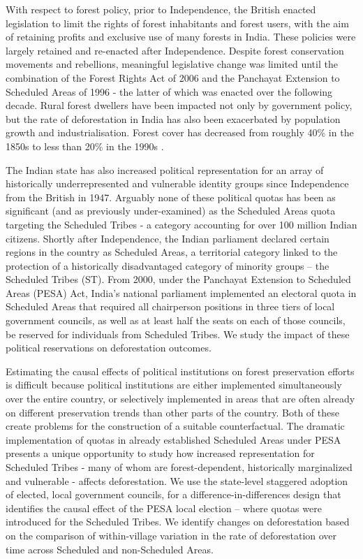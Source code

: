 \documentclass[12pt,reqno]{article}
\begin{document}
With respect to forest policy, prior to Independence, the British enacted legislation to limit the rights of forest inhabitants and forest users, with the aim of retaining profits and exclusive use of many forests in India. These policies were largely retained and re-enacted after Independence. Despite forest conservation movements and rebellions, meaningful legislative change was limited until the combination of the Forest Rights Act of 2006 and the Panchayat Extension to Scheduled Areas of 1996 - the latter of which was enacted over the following decade. Rural forest dwellers have been impacted not only by government policy, but the rate of deforestation in India has also been exacerbated by population growth and industrialisation. Forest cover has decreased from roughly 40\% in the 1850s to less than 20\% in the 1990s \parencite{lynch1995balancing}.


The Indian state has also increased political representation for an array of historically underrepresented and vulnerable identity groups since Independence from the British in 1947. Arguably none of these political quotas has been as significant (and as previously under-examined) as the Scheduled Areas quota targeting the Scheduled Tribes - a category accounting for over 100 million Indian citizens. Shortly after Independence, the Indian parliament declared certain regions in the country as Scheduled Areas, a territorial category linked to the protection of a historically disadvantaged category of minority groups -- the Scheduled Tribes (ST). From 2000, under the Panchayat Extension to Scheduled Areas (PESA) Act, India’s national parliament implemented an electoral quota in Scheduled Areas that required all chairperson positions in three tiers of local government councils, as well as at least half the seats on each of those councils, be reserved for individuals from Scheduled Tribes. We study the impact of these political reservations on deforestation outcomes.

Estimating the causal effects of political institutions on forest preservation efforts is difficult because political institutions are either implemented simultaneously over the entire country, or  selectively implemented in areas that are often already on different preservation trends than other parts of the country. Both of these create problems for the construction of a suitable counterfactual. The dramatic implementation of quotas in already established Scheduled Areas under PESA presents a unique opportunity to study how increased representation for Scheduled Tribes - many of whom are forest-dependent, historically marginalized and vulnerable - affects deforestation. We use the state-level staggered adoption of elected, local government councils, for a difference-in-differences design that identifies the causal effect of the PESA local election -- where quotas were introduced for the Scheduled Tribes. We identify changes on deforestation based on the comparison of within-village variation in the rate of deforestation over time across Scheduled and non-Scheduled Areas. 
\end{document}
